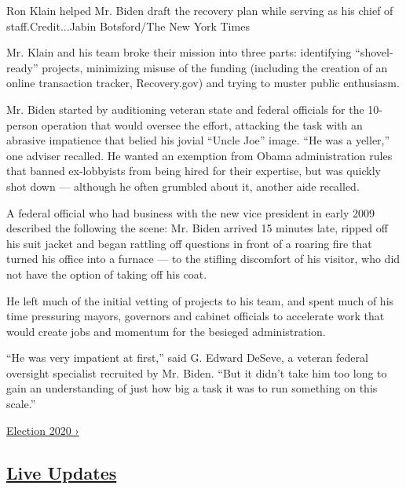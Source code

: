 Ron Klain helped Mr. Biden draft the recovery plan while serving as his
chief of staff.Credit...Jabin Botsford/The New York Times

Mr. Klain and his team broke their mission into three parts: identifying
``shovel-ready'' projects, minimizing misuse of the funding (including
the creation of an online transaction tracker, Recovery.gov) and trying
to muster public enthusiasm.

Mr. Biden started by auditioning veteran state and federal officials for
the 10-person operation that would oversee the effort, attacking the
task with an abrasive impatience that belied his jovial ``Uncle Joe''
image. ``He was a yeller,'' one adviser recalled. He wanted an exemption
from Obama administration rules that banned ex-lobbyists from being
hired for their expertise, but was quickly shot down --- although he
often grumbled about it, another aide recalled.

A federal official who had business with the new vice president in early
2009 described the following the scene: Mr. Biden arrived 15 minutes
late, ripped off his suit jacket and began rattling off questions in
front of a roaring fire that turned his office into a furnace --- to the
stifling discomfort of his visitor, who did not have the option of
taking off his coat.

He left much of the initial vetting of projects to his team, and spent
much of his time pressuring mayors, governors and cabinet officials to
accelerate work that would create jobs and momentum for the besieged
administration.

``He was very impatient at first,'' said G. Edward DeSeve, a veteran
federal oversight specialist recruited by Mr. Biden. ``But it didn't
take him too long to gain an understanding of just how big a task it was
to run something on this scale.''

\href{https://www.nytimes3xbfgragh.onion/news-event/2020-election}{Election
2020 ›}

\hypertarget{live-updates}{%
\subsection{\texorpdfstring{\href{https://www.nytimes3xbfgragh.onion/live/2020/09/09/us/trump-vs-biden}{Live
Updates}}{Live Updates}}\label{live-updates}}

\href{https://www.nytimes3xbfgragh.onion/live/2020/09/09/us/trump-vs-biden\#polls-show-biden-maintaining-a-narrow-lead-in-wisconsin-and-widening-his-advantage-in-pennsylvania}{}

